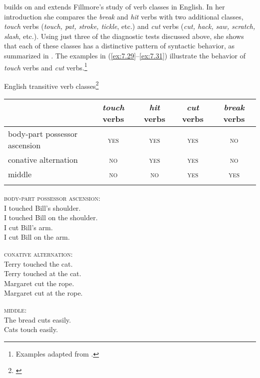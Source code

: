 \citet{Levin1993} builds on and extends Fillmore’s study of verb classes in English. In her introduction she compares the \textit{break} and \textit{hit} verbs with two additional classes, \textit{touch} verbs (\textit{touch, pat, stroke, tickle}, etc.) and \textit{cut} verbs (\textit{cut, hack, saw, scratch, slash}, etc.). Using just three of the diagnostic tests discussed above, she shows that each of these classes has a distinctive pattern of syntactic behavior, as summarized in . The examples in (\ref{ex:7.29}--\ref{ex:7.31}) illustrate the behavior of \textit{touch} verbs and \textit{cut} verbs.\footnote{Examples adapted from \citet[6--7]{Levin1993}.}


\ea English transitive verb classes\footnote{\citet[8]{Levin1993}}\\
\begin{tabularx}{.9\textwidth}{Qcccc} 
\lsptoprule
& \textit{touch} verbs & \textit{hit} verbs & \textit{cut} verbs & \textit{break} verbs\\
\midrule
body-part possessor ascension & \scshape yes & \scshape yes & \scshape yes & \scshape no\\
\tablevspace
conative alternation & \scshape no & \scshape yes & \scshape yes & \scshape no\\
\tablevspace
middle & \scshape no & \scshape no & \scshape yes & \scshape yes\\
\lspbottomrule
\end{tabularx}
\z

\ea \label{ex:7.29}
\textsc{body-part possessor ascension}:\\
\ea  I touched Bill’s shoulder.\\
\ex  I touched Bill on the shoulder.\\
\ex  I cut Bill’s arm.\\
\ex  I cut Bill on the arm.
                       \z
\z

\ea \label{ex:7.39}  \textsc{conative alternation}:\\
\ea  Terry touched the cat.\\
\ex *Terry touched at the cat.\\
\ex  Margaret cut the rope.\\
\ex  Margaret cut at the rope.
                       \z
\z

\ea \label{ex:7.31}
\textsc{middle}:\\
\ea  The bread cuts easily.\\
\ex *Cats touch easily.
                       \z
\z


